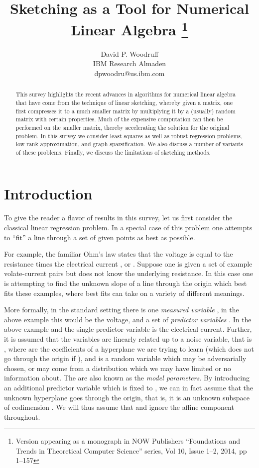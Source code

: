 \documentclass[11pt]{article}
\title{Sketching as a Tool for Numerical Linear Algebra
\footnote{Version appearing as a monograph in NOW Publishers
``Foundations and Trends in Theoretical Computer Science'' series,
Vol 10, Issue 1--2, 2014, pp 1--157}}
\author{David P. Woodruff\\
IBM Research Almaden\\
dpwoodru@us.ibm.com
}
\begin{document}
\maketitle


\begin{abstract}
This survey highlights the recent advances in algorithms for
numerical linear algebra that have come from the technique of
linear sketching, whereby given a matrix, one first compresses it to
a much smaller matrix by multiplying it by a (usually) random 
matrix with certain
properties. Much of the expensive computation can then be performed on
the smaller matrix, thereby accelerating the solution for the original
problem. 
In this survey we consider least squares as well as robust regression problems,
low rank approximation, and graph sparsification. We also discuss a number
of variants of these problems. Finally, we discuss the limitations of 
sketching methods.
\end{abstract}
\newpage
\tableofcontents
\newpage
\section{Introduction}
To give the reader a flavor of results in this survey, let us
first consider the classical linear regression problem.
In a special case of this problem one attempts to ``fit'' a line through a set
of given points as best as possible. 

For example, the familiar
Ohm's law states that the voltage  is equal to the resistance
 times the electrical current , or . Suppose one is
given a set of  example volate-current pairs 
but does not know the underlying resistance. In this case one is
attempting to find the unknown slope of a line through the origin
which best fits these examples, where best fits can take on a
variety of different meanings. 

More formally, in the standard setting there is one {\it measured variable}
, in the above example this would be the voltage, and a set of
 {\it predictor variables} . In the above example 
and the single predictor variable is the electrical current. 
Further, it is assumed
that the variables are linearly related up to a noise variable, that is
, where 
are the coefficients of a hyperplane we are trying to learn 
(which does not go through the origin
if ), and  is a random variable which may be adversarially
chosen, or may come from a distribution which we may have limited or no 
information about. The  are also known as the {\it model parameters}. By
introducing an additional predictor variable  which is fixed to , 
we can in fact assume that the unknown hyperplane goes through the origin,
that is, it is an unknown subspace of codimension . We will thus assume
that  and ignore the affine component
throughout.
\end{document}
